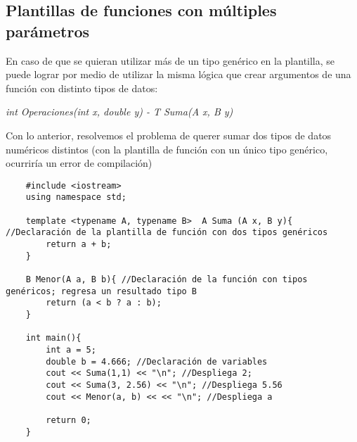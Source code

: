 \subsection{Plantillas de funciones con múltiples parámetros}
En caso de que se quieran utilizar más de un tipo genérico en la plantilla, se puede lograr por medio de utilizar la misma lógica que crear argumentos de una función con distinto tipos de datos:\begin{center}\textit{int Operaciones(int x, double y) - T Suma(A x, B y) }\end{center}
Con lo anterior, resolvemos el problema de querer sumar dos tipos de datos numéricos distintos (con la plantilla de función con un único tipo genérico, ocurriría un error de compilación)
\begin{lstlisting}
    #include <iostream>
    using namespace std;
    
    template <typename A, typename B>  A Suma (A x, B y){ //Declaración de la plantilla de función con dos tipos genéricos
        return a + b;
    }
    
    B Menor(A a, B b){ //Declaración de la función con tipos genéricos; regresa un resultado tipo B
        return (a < b ? a : b);
    }
    
    int main(){
        int a = 5;
        double b = 4.666; //Declaración de variables
        cout << Suma(1,1) << "\n"; //Despliega 2;
        cout << Suma(3, 2.56) << "\n"; //Despliega 5.56
        cout << Menor(a, b) << << "\n"; //Despliega a
        
        return 0;
    }
\end{lstlisting}

